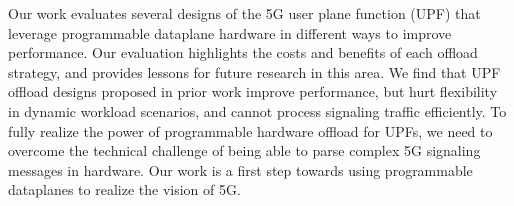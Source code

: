 
Our work evaluates several designs of the 5G user plane function (UPF) that leverage programmable dataplane hardware in different ways to improve performance. Our evaluation highlights the costs and benefits of each offload strategy, and provides lessons for future research in this area. We find that UPF offload designs proposed in prior work improve performance, but hurt flexibility in dynamic workload scenarios, and cannot process signaling traffic efficiently. To fully realize the power of programmable hardware offload for UPFs, we need to overcome the technical challenge of being able to parse complex 5G signaling messages in hardware. Our work is a first step towards using programmable dataplanes to realize the vision of 5G. 